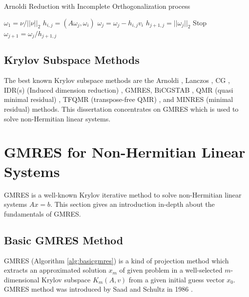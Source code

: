 \begin{algorithm}[t]{}
	\caption{Arnoldi Reduction with Incomplete Orthogonalization process}   
	\label{alg:arnoldi-incomplete-reduction}   
	\begin{algorithmic}[1]
		\State $\omega_1=\nu /||\nu||_2$
		\State $h_{i,j}=(A\omega_j,\omega_i)$
		\State $\omega_j=\omega_j-h_{i,j}v_i$
		\EndFor
		\State $h_{j+1,j}=||\omega_j||_2$
		 Stop
		\EndIf
		\State $\omega_{j+1}=\omega_j/h_{j+1,j}$
		\EndFor 
		\EndFunction
	\end{algorithmic}  
\end{algorithm}

\subsection{Krylov Subspace Methods}

The best known Krylov subspace methods are the Arnoldi \cite{voss2004arnoldi}, Lanczos \cite{widlund1978lanczos}, CG \cite{lasdon1967conjugate}, IDR(s) (Induced dimension reduction) \cite{van2015induced}, GMRES, BiCGSTAB \cite{sleijpen1993bicgstab}, QMR (quasi minimal residual) \cite{freund1991qmr}, TFQMR (transpose-free QMR) \cite{basermann1996qmr}, and MINRES (minimal residual) \cite{paige1975solution} methods. This dissertation concentrates on GMRES which is used to solve non-Hermitian linear systems.

\section{GMRES for Non-Hermitian Linear Systems}

GMRES is a well-known Krylov iterative method to solve non-Hermitian linear systems $Ax=b$. This section gives an introduction in-depth about the fundamentals of GMRES.

\subsection{Basic GMRES Method}

GMRES (Algorithm \ref{alg:basicgmres}) is a kind of projection method which extracts an approximated solution $x_m$ of given problem in a well-selected $m$-dimensional Krylov subspace \(K_m(A,v)\) from a given initial guess vector $x_0$.  GMRES method was introduced by Saad and  Schultz in 1986 \cite{saad1986gmres}.

